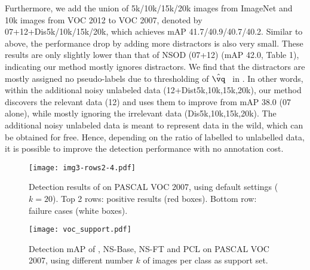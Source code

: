 Furthermore, we add the union of 5k/10k/15k/20k images from ImageNet and 10k images from VOC 2012 to VOC 2007, denoted by 07+12+Dis5k/10k/15k/20k, which achieves mAP 41.7/40.9/40.7/40.2. Similar to above, the performance drop by adding more distractors is also very small. These results are only slightly lower than that of NSOD (07+12) (mAP 42.0, Table 1), indicating our method mostly ignores distractors. We find that the distractors are mostly assigned no pseudo-labels due to thresholding of $\hat{\vq}$~ in \ours. In other words, within the additional noisy unlabeled data (12+Dist5k,10k,15k,20k), our method discovers the relevant data (12) and uses them to improve from mAP 38.0 (07 alone), while mostly ignoring the irrelevant data (\ie Dis5k,10k,15k,20k). The additional noisy unlabeled data is meant to represent data in the wild, which can be obtained for free. Hence, depending on the ratio of labelled to unlabelled data, it is possible to improve the detection performance with no annotation cost.


\begin{figure*}[t]
	\centering
	\texttt{[image: img3-rows2-4.pdf]}
	\caption{\small Detection results of \ours on PASCAL VOC 2007, using default settings ($k=20$).
		Top 2 rows: positive results (red boxes). Bottom row: failure cases (white boxes).
	}
	\label{Fig:result}
\end{figure*}


\begin{figure}[t]
	\centering
	\texttt{[image: voc\_support.pdf]}
	\caption{\small Detection mAP of \ours, NS-Base, NS-FT and PCL on PASCAL VOC 2007, using different number $k$ of images per class as support set.
	}
	\label{Fig:result_voc_support}
\end{figure}


